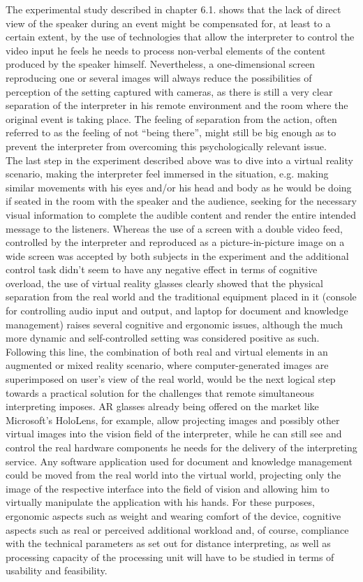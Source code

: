 \documentclass[output=paper]{langsci/langscibook}
\begin{document}
The experimental study described in chapter 6.1. shows that the lack of direct view of the speaker during an event might be compensated for, at least to a certain extent, by the use of technologies that allow the interpreter to control the video input he feels he needs to process non-verbal elements of the content produced by the speaker himself. Nevertheless, a one-dimensional screen reproducing one or several images will always reduce the possibilities of perception of the setting captured with cameras, as there is still a very clear separation of the interpreter in his remote environment and the room where the original event is taking place. The feeling of separation from the action, often referred to as the feeling of not “being there”, might still be big enough as to prevent the interpreter from overcoming this psychologically relevant issue. \\
The last step in the experiment described above was to dive into a virtual reality scenario, making the interpreter feel immersed in the situation, e.g. making similar movements with his eyes and/or his head and body as he would be doing if seated in the room with the speaker and the audience, seeking for the necessary visual information to complete the audible content and render the entire intended message to the listeners. Whereas the use of a screen with a double video feed, controlled by the interpreter and reproduced as a picture-in-picture image on a wide screen was accepted by both subjects in the experiment and the additional control task didn’t seem to have any negative effect in terms of cognitive overload, the use of virtual reality glasses clearly showed that the physical separation from the real world and the traditional equipment placed in it (console for controlling audio input and output, and laptop for document and knowledge management) raises several cognitive and ergonomic issues, although the much more dynamic and self-controlled setting was considered positive as such. \\
Following this line, the combination of both real and virtual elements in an augmented or mixed reality scenario, where computer-generated images are superimposed on user’s view of the real world, would be the next logical step towards a practical solution for the challenges that remote simultaneous interpreting imposes. AR glasses already being offered on the market like Microsoft’s HoloLens, for example, allow projecting images and possibly other virtual images into the vision field of the interpreter, while he can still see and control the real hardware components he needs for the delivery of the interpreting service. Any software application used for document and knowledge management could be moved from the real world into the virtual world, projecting only the image of the respective interface into the field of vision and allowing him to virtually manipulate the application with his hands. For these purposes, ergonomic aspects such as weight and wearing comfort of the device, cognitive aspects such as real or perceived additional workload and, of course, compliance with the technical parameters as set out for distance interpreting, as well as processing capacity of the processing unit will have to be studied in terms of usability and feasibility.
\end{document}
